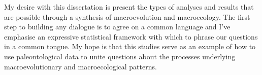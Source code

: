 My desire with this dissertation is present the types of analyses and results that are possible through a synthesis of macroevolution and macroecology. The first step to building any dialogue is to agree on a common language and I've emphasise an expressive statistical framework with which to phrase our questions in a common tongue. My hope is that this studies serve as an example of how to use paleontological data to unite questions about the processes underlying macroevolutionary and macroecological patterns.

